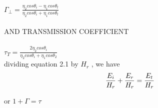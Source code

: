 \\
 $\Gamma_{\bot} = \frac{\eta_{2} cos\theta_{i} - \eta_{1} cos\theta_{t}}{\eta_{2} cos\theta_{i} + \eta_{1} cos\theta_{t}}$\\
\\
 AND TRANSMISSION COEFFICIENT\newline
\\
 \\
  $\tau_{T} = \frac{2 \eta_{2} cos\theta_{i}}{\eta_{2} cos\theta_{i} + \eta_{1} cos\theta_{2}}$\\
dividing equation 2.1 by $H_{r}$ , we have\\
\begin{equation}
\centering
\frac{E_{i}}{H_{r}} + \frac{E_{r}}{H_{r}} = \frac{E_{t}}{H_{r}}
\end{equation}

\begin{center}
	or
$1 + \Gamma = \tau$
\end{center}

